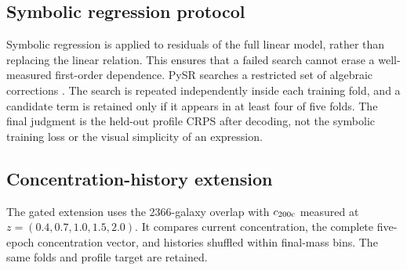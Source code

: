 \subsection{Symbolic regression protocol}

Symbolic regression is applied to residuals of the full linear model, rather
than replacing the linear relation. This ensures that a failed search cannot
erase a well-measured first-order dependence. PySR searches a restricted set of
algebraic corrections \citep{Cranmer2023}. The search is repeated independently
inside each training fold, and a candidate term is retained only if it appears
in at least four of five folds. The final judgment is the held-out profile CRPS
after decoding, not the symbolic training loss or the visual simplicity of an
expression.

\subsection{Concentration-history extension}

The gated extension uses the 2366-galaxy overlap with $c_{200\mathrm{c}}$ measured at
$z=(0.4,0.7,1.0,1.5,2.0)$. It compares current concentration, the complete
five-epoch concentration vector, and histories shuffled within final-mass bins.
The same folds and profile target are retained.
